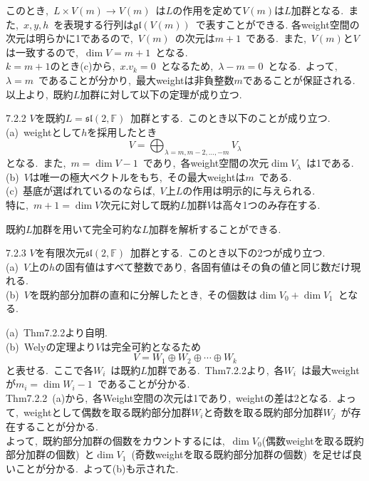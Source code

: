\documentclass[uplatex,dvipdfmx]{jsarticle}
\begin{document}
このとき,~$L\times V(m) \to V(m)$~は$L$の作用を定めて$V(m)$は$L$加群となる.~また,~$x,y,h$~を表現する行列は$\mathfrak{gl}(V(m))$~で表すことができる.
各weight空間の次元は明らかに1であるので,~$V(m)$~の次元は$m+1$~である.~また,~$V(m)$と$V$は一致するので,~$\dim V = m+1$~となる.\\
$k = m+1$のとき(c)から,~$x.v_k = 0$~となるため,~$\lambda - m = 0$~となる.~よって,~$\lambda = m$~であることが分かり,~最大weightは非負整数$m$であることが保証される.\\
以上より,~既約$L$加群に対して以下の定理が成り立つ.
\begin{mythm}{7.2.2}
    $V$を既約$L = \mathfrak{sl}(2,\mathbb{F})$~加群とする.~このとき以下のことが成り立つ.\\
    (a)~weightとして$h$を採用したとき
    \begin{equation*}
        V = \bigoplus_{\lambda = m,m-2,\ldots,-m} V_{\lambda}
    \end{equation*}
    となる.~また,~$m = \dim V - 1$~であり,~各weight空間の次元$\dim V_\lambda$~は1である.\\
    (b)~$V$は唯一の極大ベクトルをもち,~その最大weightは$m$~である.\\
    (c)~基底が選ばれているのならば,~$V$上$L$の作用は明示的に与えられる.\\
    特に,~$m+1 = \dim V$次元に対して既約$L$加群$V$は高々1つのみ存在する.
\end{mythm}
既約$L$加群を用いて完全可約な$L$加群を解析することができる.
\begin{mycor}{7.2.3}
    $V$を有限次元$\mathfrak{sl}(2,\mathbb{F})$~加群とする.~このとき以下の2つが成り立つ.\\
    (a)~$V$上の$h$の固有値はすべて整数であり,~各固有値はその負の値と同じ数だけ現れる.\\
    (b)~$V$を既約部分加群の直和に分解したとき,~その個数は$\dim V_0 + \dim V_1$~となる.
\end{mycor}
\begin{myproof}
    (a)~Thm7.2.2より自明.\\
    (b)~Welyの定理より$V$は完全可約となるため
    \begin{equation*}
        V = W_1 \oplus W_2 \oplus \cdots \oplus W_k
    \end{equation*}
    と表せる.~ここで各$W_i$~は既約$L$加群である.~Thm7.2.2より,~各$W_i$~は最大weightが$m_i = \dim W_i -1$~であることが分かる.\\
    Thm7.2.2~(a)から,~各Weight空間の次元は1であり,~weightの差は2となる.~よって,~weightとして偶数を取る既約部分加群$W_i$と奇数を取る既約部分加群$W_j$~が存在することが分かる.\\
    よって,~既約部分加群の個数をカウントするには,~$\dim V_0$(偶数weightを取る既約部分加群の個数)~と$\dim V_1$~(奇数weightを取る既約部分加群の個数)~を足せば良いことが分かる.~よって(b)も示された.
\end{myproof}
\end{document}

